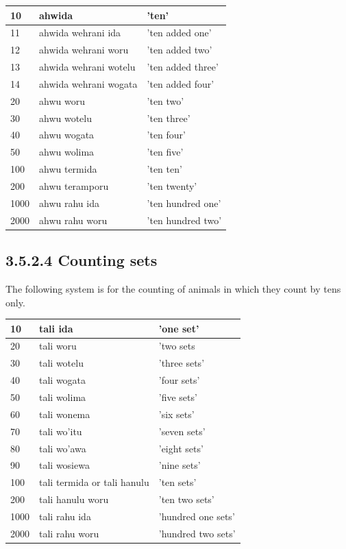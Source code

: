 \documentclass[10pt]{article}
\begin{document}
\begin{center}
\begin{tabular}{|l|l|l|}
\hline
10 & ahwida & 'ten' \\
\hline
11 & ahwida wehrani ida & 'ten added one' \\
\hline
12 & ahwida wehrani woru & 'ten added two' \\
\hline
13 & ahwida wehrani wotelu & 'ten added three' \\
\hline
14 & ahwida wehrani wogata & 'ten added four' \\
\hline
20 & ahwu woru & 'ten two' \\
\hline
30 & ahwu wotelu & 'ten three' \\
\hline
40 & ahwu wogata & 'ten four' \\
\hline
50 & ahwu wolima & 'ten five' \\
\hline
100 & ahwu termida & 'ten ten' \\
\hline
200 & ahwu teramporu & 'ten twenty' \\
\hline
1000 & ahwu rahu ida & 'ten hundred one' \\
\hline
2000 & ahwu rahu woru & 'ten hundred two' \\
\hline
\end{tabular}
\end{center}

\subsection*{3.5.2.4 Counting sets}
The following system is for the counting of animals in which they count by tens only.

\begin{center}
\begin{tabular}{|l|l|l|}
\hline
10 & tali ida & 'one set' \\
\hline
20 & tali woru & 'two sets \\
\hline
30 & tali wotelu & 'three sets' \\
\hline
40 & tali wogata & 'four sets' \\
\hline
50 & tali wolima & 'five sets' \\
\hline
60 & tali wonema & 'six sets' \\
\hline
70 & tali wo'itu & 'seven sets' \\
\hline
80 & tali wo'awa & 'eight sets' \\
\hline
90 & tali wosiewa & 'nine sets' \\
\hline
100 & tali termida or tali hanulu & 'ten sets' \\
\hline
200 & tali hanulu woru & 'ten two sets' \\
\hline
1000 & tali rahu ida & 'hundred one sets' \\
\hline
2000 & tali rahu woru & 'hundred two sets' \\
\hline
\end{tabular}
\end{center}
\end{document}
